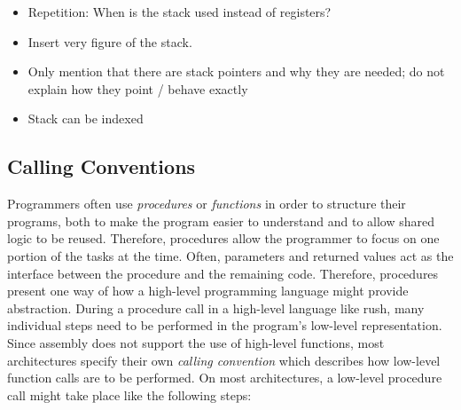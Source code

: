 \begin{itemize}
	\item Repetition: When is the stack used instead of registers?
	\item Insert very figure of the stack.
	\item Only mention that there are stack pointers and why they are needed; do not explain how they point / behave exactly
	\item Stack can be indexed
\end{itemize}

\subsection{Calling Conventions}

Programmers often use \emph{procedures} or \emph{functions} in order to structure their programs,
both to make the program easier to understand and to allow shared logic to be reused.
Therefore, procedures allow the programmer to focus on one portion of the tasks at the time.
Often, parameters and returned values act as the interface between the procedure and the remaining code.
Therefore, procedures present one way of how a high-level programming language might provide abstraction.
During a procedure call in a high-level language like rush, many individual steps need to be performed in the program's low-level representation.
Since assembly does not support the use of high-level functions, most architectures specify their own \emph{calling convention} which describes how low-level function calls are to be performed.
On most architectures, a low-level procedure call might take place like the following steps:

